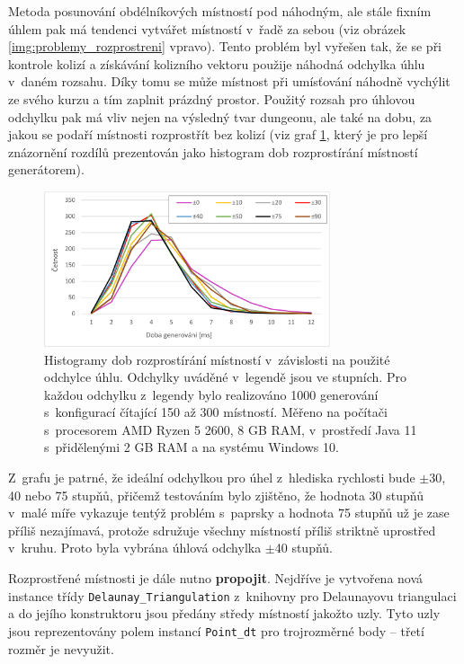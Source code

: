 Metoda posunování obdélníkových místností pod náhodným, ale stále fixním úhlem pak má tendenci vytvářet  místností v~řadě za sebou (viz obrázek \ref{img:problemy_rozprostreni} vpravo).
Tento problém byl vyřešen tak, že se při kontrole kolizí a získávání kolizního vektoru použije náhodná odchylka úhlu v~daném rozsahu.
Díky tomu se může místnost při umísťování náhodně vychýlit ze svého kurzu a tím zaplnit prázdný prostor.
Použitý rozsah pro úhlovou odchylku pak má vliv nejen na výsledný tvar dungeonu, ale také na dobu, za jakou se podaří místnosti rozprostřít bez kolizí (viz graf \ref{img:histogram_uhly}, který je pro lepší znázornění rozdílů prezentován jako histogram dob rozprostírání místností generátorem).
\begin{figure}[ht]
    \centering
    \includegraphics[width=0.75\textwidth]{obrazky/histogram_uhly.pdf}
    \caption{Histogramy dob rozprostírání místností v~závislosti na použité odchylce úhlu. Odchylky uváděné v~legendě jsou ve stupních. Pro každou odchylku z~legendy bylo realizováno 1000 generování s~konfigurací čítající 150 až 300 místností. Měřeno na počítači s~procesorem AMD Ryzen 5 2600, 8 GB RAM, v~prostředí Java 11 s~přidělenými 2 GB RAM a na systému Windows 10.}
    \label{img:histogram_uhly}
\end{figure}
\par
Z~grafu je patrné, že ideální odchylkou pro úhel z~hlediska rychlosti bude $\pm$30, 40 nebo 75 stupňů, přičemž testováním bylo zjištěno, že hodnota 30 stupňů v~malé míře vykazuje tentýž problém s~paprsky a hodnota 75 stupňů už je zase příliš nezajímavá, protože sdružuje všechny místností příliš striktně uprostřed v~kruhu.
Proto byla vybrána úhlová odchylka $\pm$40 stupňů.
\par
Rozprostřené místnosti je dále nutno \textbf{propojit}.
Nejdříve je vytvořena nová instance třídy \texttt{Delaunay\_Triangulation} z~knihovny pro Delaunayovu triangulaci a do jejího konstruktoru jsou předány středy místností jakožto uzly.
Tyto uzly jsou reprezentovány polem instancí \texttt{Point\_dt} pro trojrozměrné body -- třetí rozměr je nevyužit.
